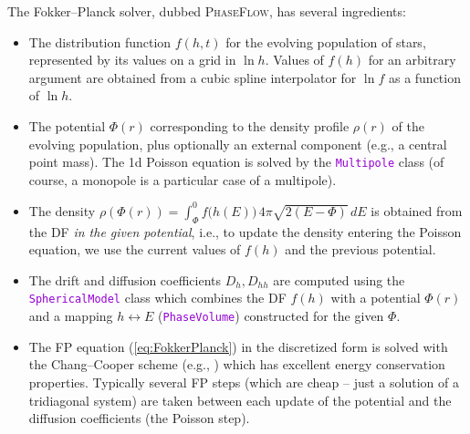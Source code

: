 \documentclass[12pt]{article}
\newcommand{\ttt}[1]{\textcolor{darkviolet}{\texttt{#1}}}
\begin{document}
The Fokker--Planck solver, dubbed \textsc{PhaseFlow}, has several ingredients:
\begin{itemize}
\item The distribution function $f(h,t)$ for the evolving population of stars, represented by its values on a grid in $\ln h$. Values of $f(h)$ for an arbitrary argument are obtained from a cubic spline interpolator for $\ln f$ as a function of $\ln h$.
\item The potential $\Phi(r)$ corresponding to the density profile $\rho(r)$ of the evolving population, plus optionally an external component (e.g., a central point mass). The 1d Poisson equation is solved by the \ttt{Multipole} class (of course, a monopole is a particular case of a multipole).
\item The density $\rho(\Phi(r)) = \int_{\Phi}^0 f\big(h(E)\big)\,4\pi\sqrt{2(E-\Phi)}\,dE$ is obtained from the DF \textit{in the given potential}, i.e., to update the density entering the Poisson equation, we use the current values of $f(h)$ and the previous potential.
\item The drift and diffusion coefficients $D_h, D_{hh}$ are computed using the \ttt{SphericalModel} class which combines the DF $f(h)$ with a potential $\Phi(r)$ and a mapping $h\leftrightarrow E$ (\ttt{PhaseVolume}) constructed for the given $\Phi$.
\item The FP equation (\ref{eq:FokkerPlanck}) in the discretized form is solved with the Chang--Cooper scheme (e.g., \cite{ParkPetrosian1996}) which has excellent energy conservation properties. Typically several FP steps (which are cheap -- just a solution of a tridiagonal system) are taken between each update of the potential and the diffusion coefficients (the Poisson step).
\end{itemize}
\end{document}
